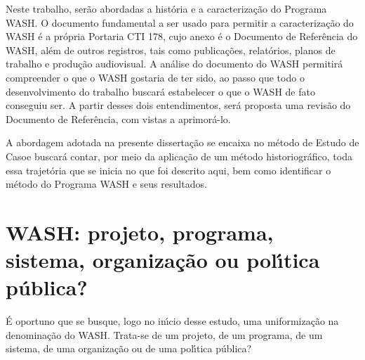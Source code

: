 \documentclass[
12pt,		%
openright,	%
twoside,  %
a4paper,			%
chapter=TITLE,		%
english,			%
french,				%
spanish,			%
brazil				%
]{USPSC-classe/USPSC}
\begin{document}
Neste trabalho, ser\~ao abordadas a hist\'oria e a caracteriza\c{c}\~ao do Programa WASH. O documento fundamental a ser usado para permitir a caracteriza\c{c}\~ao do WASH \'e a pr\'opria Portaria CTI 178, cujo anexo \'e o Documento de Refer\^encia do WASH, al\'em de outros registros, tais como publica\c{c}\~oes, relat\'orios, planos de trabalho e produ\c{c}\~ao audiovisual. A an\'alise do documento do WASH permitir\'a compreender \textquotedbl o que o WASH gostaria de ter sido\textquotedbl , ao passo que todo o desenvolvimento do trabalho buscar\'a estabelecer \textquotedbl o que o WASH de fato conseguiu ser\textquotedbl . A partir desses dois entendimentos, ser\'a proposta uma revis\~ao do Documento de Refer\^encia, com vistas a aprimor\'a-lo.

















A abordagem adotada na presente disserta\c{c}\~ao se encaixa no m\'etodo de \textquotedbl Estudo de Caso\textquotedbl   e buscar\'a contar, por meio da aplica\c{c}\~ao de um m\'etodo historiogr\'afico, toda essa trajet\'oria que se inicia no que foi descrito aqui, bem como identificar o m\'etodo do Programa WASH e seus resultados.

















\section[WASH: projeto, programa, sistema, organiza\c{c}\~ao ou pol\'{\i}tica p\'ublica?]{WASH: projeto, programa, sistema, organiza\c{c}\~ao ou pol\'{\i}tica p\'ublica?}\label{WASH: projeto, programa, sistema, organiza\c{c}\~ao ou pol\'{\i}tica p\'ublica?}
\'E oportuno que se busque, logo no in\'{\i}cio desse estudo, uma uniformiza\c{c}\~ao na denomina\c{c}\~ao do WASH. Trata-se de um projeto, de um programa, de um sistema, de uma organiza\c{c}\~ao ou de uma pol\'{\i}tica p\'ublica?
\end{document}
